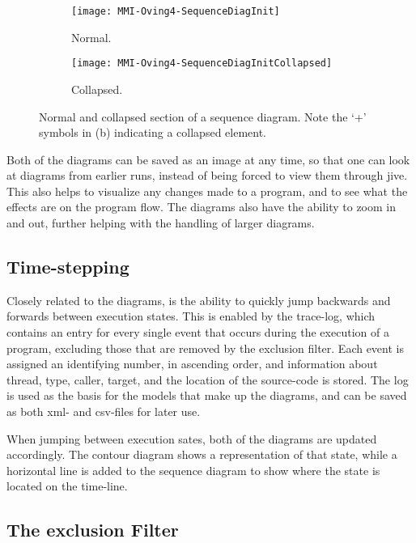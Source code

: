 \begin{figure}[H]
	\centering
	\begin{subfigure}{\textwidth}
		\centering
		\texttt{[image: MMI-Oving4-SequenceDiagInit]}
		\caption{Normal.}
		\label{fig:seqOving4CollapseA}
	\end{subfigure}
	\begin{subfigure}{\textwidth}
		\centering
		\texttt{[image: MMI-Oving4-SequenceDiagInitCollapsed]}
		\caption{Collapsed.}
		\label{fig:seqOving4CollapseB}
	\end{subfigure}
	\caption[Normal and collapsed section of a sequence diagram.]{Normal and collapsed section of a sequence diagram. Note the `+' symbols in (b) indicating a collapsed element.}
	\label{fig:seqOving4Collapse} 
\end{figure}

Both of the diagrams can be saved as an image at any time, so that one can look at diagrams from earlier runs, instead of being forced to view them through \gls{jive}.
This also helps to visualize any changes made to a program, and to see what the effects are on the program flow.
The diagrams also have the ability to zoom in and out, further helping with the handling of larger diagrams.

\subsection{Time-stepping}\label{jiveFeatTimeStep}

Closely related to the diagrams, is the ability to quickly jump backwards and forwards between execution states.
This is enabled by the trace-log, which contains an entry for every single event that occurs during the execution of a program, excluding those that are removed by the exclusion filter.
Each event is assigned an identifying number, in ascending order, and information about thread, type, caller, target, and the location of the source-code is stored.
The log is used as the basis for the models that make up the diagrams, and can be saved as both \gls{xml}- and \gls{csv}-files for later use.

When jumping between execution sates, both of the diagrams are updated accordingly.
The contour diagram shows a representation of that state, while a horizontal line is added to the sequence diagram to show where the state is located on the time-line.

\subsection{The exclusion Filter}\label{jiveFeatFilter}

